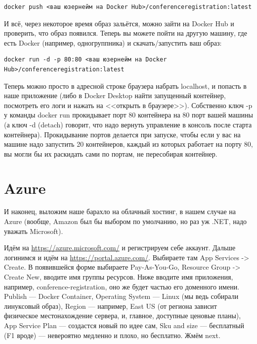 \documentclass{../../text-style}
\begin{document}
\begin{verbatim}
docker push <ваш юзернейм на Docker Hub>/conferenceregistration:latest
\end{verbatim}

И всё, через некоторое время образ зальётся, можно зайти на Docker Hub и проверить, что образ появился. Теперь вы можете пойти на другую машину, где есть Docker (например, одногруппника) и скачать/запустить ваш образ:

\begin{verbatim}
docker run -d -p 80:80 <ваш юзернейм на Docker Hub>/conferenceregistration:latest
\end{verbatim}

Теперь можно просто в адресной строке браузера набрать localhost, и попасть в наше приложение (либо в Docker Desktop найти запущенный контейнер, посмотреть его логи и нажать на <<открыть в браузере>>). Собственно ключ -p у команды docker run прокидывает порт 80 контейнера на 80 порт вашей машины (а ключ -d (detach) говорит, что надо вернуть управление в консоль после старта контейнера). Прокидывание портов делается при запуске, чтобы если у вас на машине надо запустить 20 контейнеров, каждый из которых работает на порту 80, вы могли бы их раскидать сами по портам, не пересобирая контейнер.

\section{Azure}

И наконец, выложим наше барахло на облачный хостинг, в нашем случае на Azure (вообще, Amazon был бы выбором по умолчанию, но раз уж .NET, надо уважать Microsoft). 

Идём на \url{https://azure.microsoft.com/} и регистрируем себе аккаунт. Дальше логинимся и идём на \url{https://portal.azure.com/}. Выбираете там App Services -> Create. В появившейся форме выбираете Pay-As-You-Go, Resource Group -> Create New, вводите имя группы ресурсов. Ниже вводите имя приложения, например, conference-registration, оно же будет частью его доменного имени. Publish --- Docker Container, Operating System --- Linux (мы ведь собирали линуксовый образ), Region --- например, East US (от региона зависит физическое местонахождение сервера, и, главное, доступные ценовые планы), App Service Plan --- создастся новый по идее сам, Sku and size --- бесплатный (F1 вроде) --- невероятно медленно и плохо, но бесплатно. Жмём next.
\end{document}

